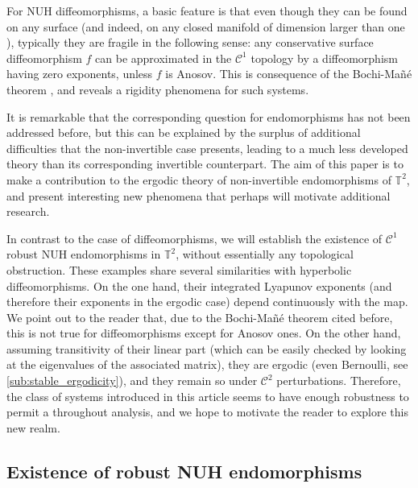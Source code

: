 \documentclass[11pt,letterpaper,reqno]{article}
\newcommand{\Tor}{\mathbb{T}^2}
\begin{document}
For NUH diffeomorphisms, a basic feature is that even though they can be found on any surface \cite{BerSurf} (and indeed, on any closed manifold of dimension larger than one \cite{EveryCompHyp}), typically they are fragile in the following sense: any conservative surface diffeomorphism $f$ can be approximated in the $\mathcal{C}^1$ topology by a diffeomorphism having zero exponents, unless $f$ is Anosov. This is consequence of the Bochi-Ma\~n\'e theorem \cite{BOCHI2002}, and reveals a rigidity phenomena for such systems.

It is remarkable that the corresponding question for endomorphisms has not been addressed before, but this can be explained by the surplus of additional difficulties that the non-invertible case presents, leading to a much less developed theory than its corresponding invertible counterpart. The aim of this paper is to make a contribution to the ergodic theory of non-invertible endomorphisms of $\Tor$, and present interesting new phenomena that perhaps will motivate additional research.

In contrast to the case of diffeomorphisms, we will establish the existence of $\mathcal C^1$ robust NUH endomorphisms in $\Tor$, without essentially any topological obstruction. These examples share several similarities with hyperbolic diffeomorphisms. On the one hand, their integrated Lyapunov exponents (and therefore their exponents in the ergodic case) depend continuously with the map. We point out to the reader that, due to the Bochi-Mañé theorem cited before, this is not true for diffeomorphisms except for Anosov ones. On the other hand, assuming transitivity of their linear part (which can be easily checked by looking at the eigenvalues of the associated matrix), they are ergodic (even Bernoulli, see \ref{sub:stable_ergodicity}), and they remain so under $\mathcal C^2$ perturbations. Therefore, the class of systems introduced in this article seems to have enough robustness to permit a throughout analysis, and we hope to motivate the reader to explore this new realm.

\subsection{Existence of robust NUH endomorphisms} %
\label{sub:existence_of_persistent_nuh_endomorphisms} 
\end{document}
